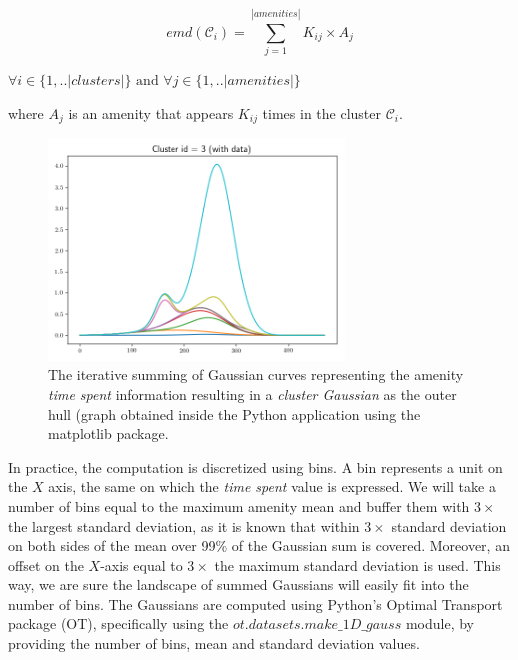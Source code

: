 	\begin{equation}
	emd(\mathcal{C}_i) = \sum_{j=1}^{|amenities|} K_{ij} \times A_j
	\end{equation}
	
	$\forall i \in \{1,..|clusters|\} \text{ and } \forall j \in \{1,..|amenities|\}$
	
	where $A_j$ is an amenity that appears $K_{ij}$ times in the cluster $\mathcal{C}_i$. \\
	
	\begin{figure}[!ht]
		\centering
		\includegraphics[width=0.7\textwidth]{graphics/emd_gaussian_addition3.png}
		\caption{The iterative summing of Gaussian curves representing the amenity \textit{time spent} information resulting in a \textit{cluster Gaussian} as the outer hull (graph obtained inside the Python application using the matplotlib package.}
		\label{fig:gaussian}
	\end{figure}
	
	
	In practice, the computation is discretized using bins. A bin represents a unit on the $X$ axis, the same on which the \textit{time spent} value is expressed. We will take a number of bins equal to the maximum amenity mean and buffer them with $3\times$ the largest standard deviation, as it is known that within $3\times$ standard deviation on both sides of the mean over 99\% of the Gaussian sum is covered. Moreover, an offset on the $X$-axis equal to $3\times$ the maximum standard deviation is used. This way, we are sure the landscape of summed Gaussians will easily fit into the number of bins. The Gaussians are computed using Python's Optimal Transport package (OT), specifically using the $ot.datasets.make\_1D\_gauss$ module, by providing the number of bins, mean and standard deviation values.
	
